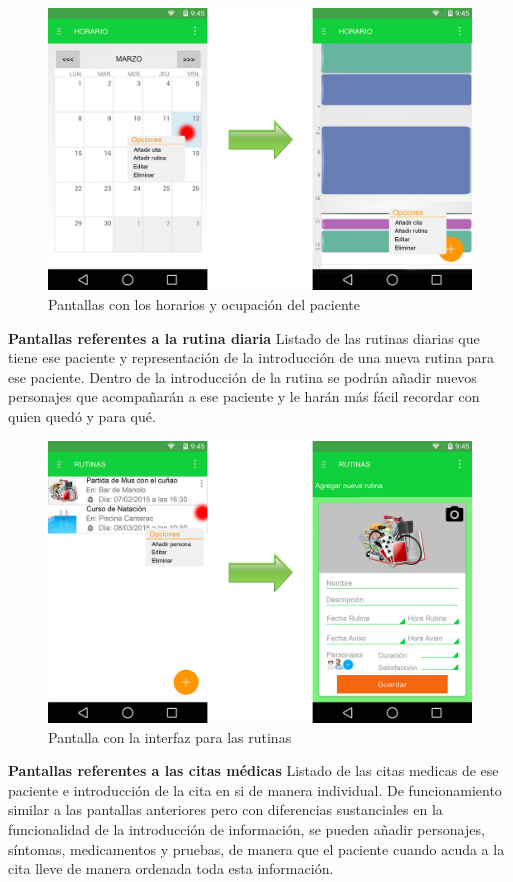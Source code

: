 \documentclass[../pfc.tex]{subfiles}
\begin{document}
			
			\begin{figure}
				\centering
				\includegraphics[width=0.7\linewidth]{../images/horario_2}
				\caption{Pantallas con los horarios y ocupación del paciente}
				\label{fig:horario_2}
			\end{figure}
			
			
			\textbf{Pantallas referentes a la rutina diaria}
			Listado de las rutinas diarias que tiene ese paciente y representación de la introducción de una nueva rutina para ese paciente.
			Dentro de la introducción de la rutina se podrán añadir nuevos personajes que acompañarán a ese paciente y le harán más fácil recordar con quien quedó y para qué.

			
			\begin{figure}
				\centering
				\includegraphics[width=0.7\linewidth]{../images/rutina}
				\caption{Pantalla con la interfaz para las rutinas}
				\label{fig:rutina}
			\end{figure}
						
			
			\textbf{Pantallas referentes a las citas médicas}
			Listado de las citas medicas de ese paciente e introducción de la cita en si de manera individual.
			De funcionamiento similar a las pantallas anteriores pero con diferencias sustanciales en la funcionalidad de la introducción de información, se pueden añadir personajes, síntomas, medicamentos y pruebas, de manera que el paciente cuando acuda a la cita lleve de manera ordenada toda esta información.
			
\end{document}
